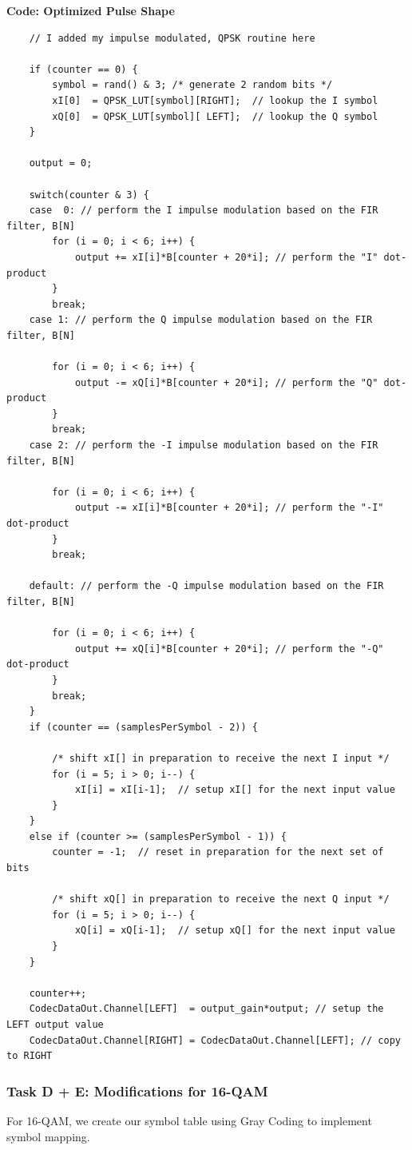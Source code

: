 \documentclass{article}
\begin{document}
\textbf{Code: Optimized Pulse Shape}
\begin{verbatim}
	// I added my impulse modulated, QPSK routine here

	if (counter == 0) {
		symbol = rand() & 3; /* generate 2 random bits */
		xI[0]  = QPSK_LUT[symbol][RIGHT];  // lookup the I symbol
		xQ[0]  = QPSK_LUT[symbol][ LEFT];  // lookup the Q symbol
	}

	output = 0;

	switch(counter & 3) {
	case  0: // perform the I impulse modulation based on the FIR filter, B[N] 
		for (i = 0; i < 6; i++) {
			output += xI[i]*B[counter + 20*i]; // perform the "I" dot-product
		}
		break;
	case 1: // perform the Q impulse modulation based on the FIR filter, B[N] 

		for (i = 0; i < 6; i++) {
			output -= xQ[i]*B[counter + 20*i]; // perform the "Q" dot-product
		}
		break;
	case 2: // perform the -I impulse modulation based on the FIR filter, B[N] 

		for (i = 0; i < 6; i++) {
			output -= xI[i]*B[counter + 20*i]; // perform the "-I" dot-product
		}
		break;

	default: // perform the -Q impulse modulation based on the FIR filter, B[N] 
		
		for (i = 0; i < 6; i++) {
			output += xQ[i]*B[counter + 20*i]; // perform the "-Q" dot-product
		}
		break;
	}
	if (counter == (samplesPerSymbol - 2)) {

		/* shift xI[] in preparation to receive the next I input */
		for (i = 5; i > 0; i--) {
			xI[i] = xI[i-1];  // setup xI[] for the next input value
		}
	}
	else if (counter >= (samplesPerSymbol - 1)) {
		counter = -1;  // reset in preparation for the next set of bits

		/* shift xQ[] in preparation to receive the next Q input */
		for (i = 5; i > 0; i--) {
			xQ[i] = xQ[i-1];  // setup xQ[] for the next input value
		}
	}

	counter++;
	CodecDataOut.Channel[LEFT]  = output_gain*output; // setup the LEFT output value
	CodecDataOut.Channel[RIGHT] = CodecDataOut.Channel[LEFT]; // copy to RIGHT

\end{verbatim}
\subsubsection{Task D + E: Modifications for 16-QAM}
For 16-QAM, we create our symbol table using Gray Coding to implement symbol mapping.
\end{document}
